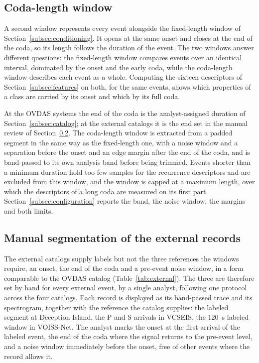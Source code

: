 \documentclass[pdflatex,sn-mathphys-num]{sn-jnl}
\begin{document}
\subsection{Coda-length window}\label{subsec:codawindow}

A second window represents every event alongside the fixed-length window of
Section~\ref{subsec:conditioning}. It opens at the same onset and closes at
the end of the coda, so its length follows the duration of the event. The
two windows answer different questions: the fixed-length window compares
events over an identical interval, dominated by the onset and the early coda,
while the coda-length window describes each event as a whole. Computing the
sixteen descriptors of Section~\ref{subsec:features} on both, for the same
events, shows which properties of a class are carried by its onset and which
by its full coda.

At the OVDAS systems the end of the coda is the analyst-assigned duration of
Section~\ref{subsec:catalog}; at the external catalogs it is the end set in
the manual review of Section~\ref{subsec:manualcut}. The coda-length window
is extracted from a padded segment in the same way as the fixed-length one,
with a noise window and a separation before the onset and an edge margin
after the end of the coda, and is band-passed to its own analysis band before
being trimmed. Events shorter than a minimum duration hold too few samples
for the recurrence descriptors and are excluded from this window, and the
window is capped at a maximum length, over which the descriptors of a long
coda are measured on its first part.
Section~\ref{subsec:configuration} reports the band, the noise window, the
margins and both limits.

\subsection{Manual segmentation of the external records}\label{subsec:manualcut}

The external catalogs supply labels but not the three references the windows
require, an onset, the end of the coda and a pre-event noise window, in a
form comparable to the OVDAS catalog (Table~\ref{tab:external}). The three
are therefore set by hand for every external event, by a single analyst,
following one protocol across the four catalogs. Each record is displayed as
its band-passed trace and its spectrogram, together with the reference the
catalog supplies: the labeled segment at Deception Island, the P and S
arrivals in VCSEIS, the 120~s labeled window in VOISS-Net. The analyst marks
the onset at the first arrival of the labeled event, the end of the coda
where the signal returns to the pre-event level, and a noise window
immediately before the onset, free of other events where the record allows
it.
\end{document}
